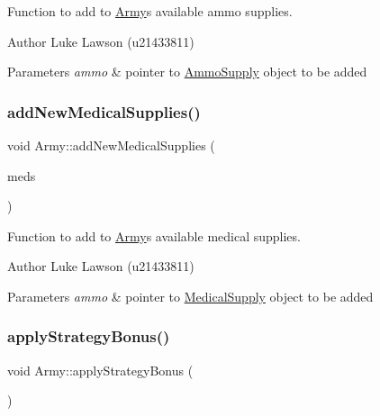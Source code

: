 Function to add to \mbox{\hyperlink{class_army}{Army}}\textquotesingle{}s available ammo supplies. 

\begin{DoxyAuthor}{Author}
Luke Lawson (u21433811) 
\end{DoxyAuthor}

\begin{DoxyParams}{Parameters}
{\em ammo} & pointer to \mbox{\hyperlink{class_ammo_supply}{Ammo\+Supply}} object to be added \\
\hline
\end{DoxyParams}
\mbox{\label{class_army_a0ca6fae9204652b57afae3cb4c44b349}} 
\subsubsection{\texorpdfstring{addNewMedicalSupplies()}{addNewMedicalSupplies()}}
{\footnotesize\ttfamily void Army\+::add\+New\+Medical\+Supplies (\begin{DoxyParamCaption}\item[{\mbox{\hyperlink{class_medical_supply}{Medical\+Supply}} $\ast$}]{meds }\end{DoxyParamCaption})}



Function to add to \mbox{\hyperlink{class_army}{Army}}\textquotesingle{}s available medical supplies. 

\begin{DoxyAuthor}{Author}
Luke Lawson (u21433811) 
\end{DoxyAuthor}

\begin{DoxyParams}{Parameters}
{\em ammo} & pointer to \mbox{\hyperlink{class_medical_supply}{Medical\+Supply}} object to be added \\
\hline
\end{DoxyParams}
\mbox{\label{class_army_a58b4b12481451ff006f5ca4e0e941c4f}} 
\subsubsection{\texorpdfstring{applyStrategyBonus()}{applyStrategyBonus()}}
{\footnotesize\ttfamily void Army\+::apply\+Strategy\+Bonus (\begin{DoxyParamCaption}{ }\end{DoxyParamCaption})}



